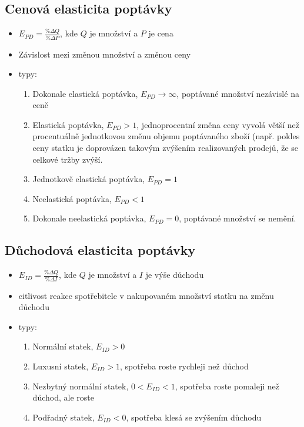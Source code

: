 \subsection{Cenová elasticita poptávky}
\begin{itemize}
    \item $E_{PD}=\frac{\%\Delta Q}{\%\Delta P}$, kde $Q$ je množství a $P$ je cena
    \item Závislost mezi změnou množství a změnou ceny
    \item typy:
    \begin{enumerate}
        \item Dokonale elastická poptávka, $E_{PD}\rightarrow \infty$, poptávané množství nezávislé na ceně
        \item Elastická poptávka, $E_{PD}>1$, jednoprocentní změna ceny vyvolá větší než procentuálně jednotkovou změnu objemu poptávaného zboží (např. pokles ceny statku je doprovázen takovým zvýšením realizovaných prodejů, že se celkové tržby zvýší.
        \item Jednotkově elastická poptávka, $E_{PD}=1$ 
        \item Neelastická poptávka, $E_{PD} < 1$
        \item Dokonale neelastická poptávka, $E_{PD}=0$, poptávané množství se nemění.
    \end{enumerate}
\end{itemize}

\subsection{Důchodová elasticita poptávky}
\begin{itemize}
    \item $E_{ID}=\frac{\% \Delta Q}{\% \Delta I}$, kde $Q$ je množství a $I$ je výše důchodu
    \item citlivost reakce spotřebitele v nakupovaném množství statku na změnu důchodu
    \item typy:
    \begin{enumerate}
        \item Normální statek, $E_{ID}>0$
        \item Luxusní statek, $E_{ID}>1$, spotřeba roste rychleji než důchod
        \item Nezbytný normální statek, $0<E_{ID}<1$, spotřeba roste pomaleji než důchod, ale roste
        \item Podřadný statek, $E_{ID}<0$, spotřeba klesá se zvýšením důchodu
    \end{enumerate}
\end{itemize}

